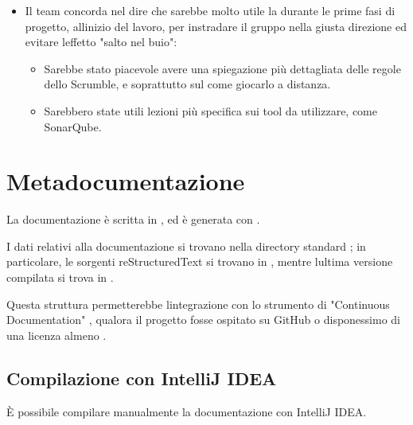 \documentclass[letterpaper,10pt,italian]{sphinxmanual}
\begin{document}
\begin{itemize}
\item {} 
\sphinxAtStartPar
Il team concorda nel dire che sarebbe molto utile la  durante le prime fasi di
progetto, all\textquotesingle{}inizio del lavoro, per instradare il gruppo nella giusta direzione ed evitare l\textquotesingle{}effetto "salto nel buio":
\begin{itemize}
\item {} 
\sphinxAtStartPar
Sarebbe stato piacevole avere una spiegazione più dettagliata delle regole dello Scrumble, e soprattutto sul come
giocarlo a distanza.

\item {} 
\sphinxAtStartPar
Sarebbero state utili lezioni più specifica sui tool da utilizzare, come SonarQube.

\end{itemize}

\end{itemize}


\chapter{Meta\sphinxhyphen{}documentazione}
\label{\detokenize{code/meta/index:meta-documentazione}}\label{\detokenize{code/meta/index::doc}}
\sphinxAtStartPar
La documentazione è scritta in , ed è generata con
.

\sphinxAtStartPar
I dati relativi alla documentazione si trovano nella directory standard ;
in particolare, le sorgenti reStructuredText si trovano in ,
mentre l\textquotesingle{}ultima versione compilata si trova in .

\sphinxAtStartPar
Questa struttura permetterebbe l\textquotesingle{}integrazione con lo strumento di "Continuous Documentation"
, qualora il progetto fosse ospitato su GitHub o disponessimo di una licenza
almeno .


\section{Compilazione con IntelliJ IDEA}
\label{\detokenize{code/meta/index:compilazione-con-intellij-idea}}
\sphinxAtStartPar
È possibile compilare manualmente la documentazione con IntelliJ IDEA.
\end{document}
